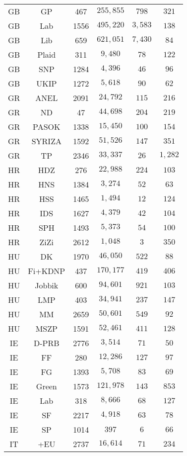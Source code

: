 \begin{table}[!htbp]
\begin{tabular}{@{\extracolsep{5pt}} cccccc}
GB & GP & 467 & $255,855$ & $798$ & $321$ \\ 
GB & Lab & 1556 & $495,220$ & $3,583$ & $138$ \\ 
GB & Lib & 659 & $621,051$ & $7,430$ & $84$ \\ 
GB & Plaid & 311 & $9,480$ & $78$ & $122$ \\ 
GB & SNP & 1284 & $4,396$ & $46$ & $96$ \\ 
GB & UKIP & 1272 & $5,618$ & $90$ & $62$ \\ 
GR & ANEL & 2091 & $24,792$ & $115$ & $216$ \\ 
GR & ND & 47 & $44,698$ & $204$ & $219$ \\ 
GR & PASOK & 1338 & $15,450$ & $100$ & $154$ \\ 
GR & SYRIZA & 1592 & $51,526$ & $147$ & $351$ \\ 
GR & TP & 2346 & $33,337$ & $26$ & $1,282$ \\ 
HR & HDZ & 276 & $22,988$ & $224$ & $103$ \\ 
HR & HNS & 1384 & $3,274$ & $52$ & $63$ \\ 
HR & HSS & 1465 & $1,494$ & $12$ & $124$ \\ 
HR & IDS & 1627 & $4,379$ & $42$ & $104$ \\ 
HR & SPH & 1493 & $5,373$ & $54$ & $100$ \\ 
HR & ZiZi & 2612 & $1,048$ & $3$ & $350$ \\ 
HU & DK & 1970 & $46,050$ & $522$ & $88$ \\ 
HU & Fi+KDNP & 437 & $170,177$ & $419$ & $406$ \\ 
HU & Jobbik & 600 & $94,601$ & $921$ & $103$ \\ 
HU & LMP & 403 & $34,941$ & $237$ & $147$ \\ 
HU & MM & 2659 & $50,601$ & $549$ & $92$ \\ 
HU & MSZP & 1591 & $52,461$ & $411$ & $128$ \\ 
IE & D-PRB & 2776 & $3,514$ & $71$ & $50$ \\ 
IE & FF & 280 & $12,286$ & $127$ & $97$ \\ 
IE & FG & 1393 & $5,708$ & $83$ & $69$ \\ 
IE & Green & 1573 & $121,978$ & $143$ & $853$ \\ 
IE & Lab & 318 & $8,666$ & $68$ & $127$ \\ 
IE & SF & 2217 & $4,918$ & $63$ & $78$ \\ 
IE & SP & 1014 & $397$ & $6$ & $66$ \\ 
IT & +EU & 2737 & $16,614$ & $71$ & $234$ \\ 

\end{tabular}
\end{table}
